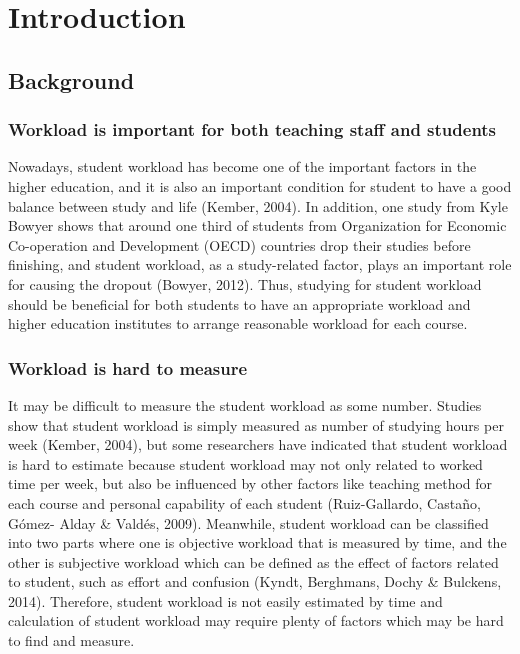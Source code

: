 \documentclass[fyp]{socreport}
\begin{document}
\tableofcontents

\chapter{Introduction}

\section{Background}
\subsection{Workload is important for both teaching staff and students}
Nowadays, student workload has become one of the important factors in the higher education, and it is also an important condition for student to have a good balance between study and life (Kember, 2004). In addition, one study from Kyle Bowyer shows that around one third of students from Organization for Economic Co-operation and Development (OECD) countries drop their studies before finishing, and student workload, as a study-related factor, plays an important role for causing the dropout (Bowyer, 2012). Thus, studying for student workload should be beneficial for both students to have an appropriate workload and higher education institutes to arrange reasonable workload for each course.

\subsection{Workload is hard to measure}
It may be difficult to measure the student workload as some number. Studies show that student workload is simply measured as number of studying hours per week (Kember, 2004), but some researchers have indicated that student workload is hard to estimate because student workload may not only related to worked time per week, but also be influenced by other factors like teaching method for each course and personal capability of each student (Ruiz-Gallardo, Castaño, Gómez- Alday \& Valdés, 2009). Meanwhile, student workload can be classified into two parts where one is objective workload that is measured by time, and the other is subjective workload which can be defined as the effect of factors related to student, such as effort and confusion (Kyndt, Berghmans, Dochy \& Bulckens, 2014). Therefore, student workload is not easily estimated by time and calculation of student workload may require plenty of factors which may be hard to find and measure.
\end{document}
